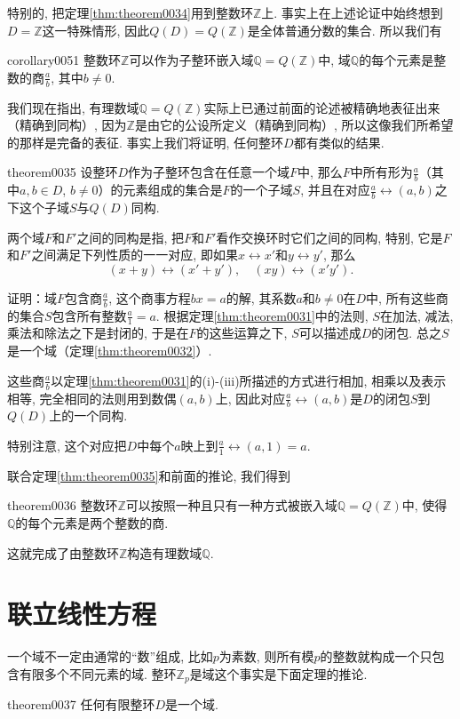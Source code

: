 特别的, 把定理\ref{thm:theorem0034}用到整数环$\mathbb{Z}$上. 事实上在上述论证中始终想到$D=\mathbb{Z}$这一特殊情形, 因此$Q(D)=Q(\mathbb{Z})$是全体普通分数的集合. 所以我们有
\begin{corollary}{}{corollary0051}
整数环$\mathbb{Z}$可以作为子整环嵌入域$\mathbb{Q}=Q(\mathbb{Z})$中, 域$\mathbb{Q}$的每个元素是整数的商$\frac{a}{b}$, 其中$b \neq 0$. 
\end{corollary}

我们现在指出, 有理数域$\mathbb{Q}=Q(\mathbb{Z})$实际上已通过前面的论述被精确地表征出来（精确到同构）, 因为$\mathbb{Z}$是由它的公设所定义（精确到同构）, 所以这像我们所希望的那样是完备的表征. 事实上我们将证明, 任何整环$D$都有类似的结果. 
\begin{theorem}{}{theorem0035}
设整环$D$作为子整环包含在任意一个域$F$中, 那么$F$中所有形为$\frac{a}{b}$（其中$a, b \in D$, $b \neq 0$）的元素组成的集合是$F$的一个子域$S$, 并且在对应$\frac{a}{b} \leftrightarrow (a, b)$之下这个子域$S$与$Q(D)$同构. 
\end{theorem}
两个域$F$和$F'$之间的同构是指, 把$F$和$F'$看作交换环时它们之间的同构, 特别, 它是$F$和$F'$之间满足下列性质的一一对应, 即如果$x \leftrightarrow x'$和$y \leftrightarrow y'$, 那么
\[
(x+y) \leftrightarrow (x'+y'), \quad (xy) \leftrightarrow (x'y').
\]

证明：域$F$包含商$\frac{a}{b}$, 这个商事方程$bx=a$的解, 其系数$a$和$b \neq 0$在$D$中, 所有这些商的集合$S$包含所有整数$\frac{a}{1}=a$. 根据定理\ref{thm:theorem0031}中的法则, $S$在加法, 减法, 乘法和除法之下是封闭的, 于是在$F$的这些运算之下, $S$可以描述成$D$的闭包. 总之$S$是一个域（定理\ref{thm:theorem0032}）. 

这些商$\frac{a}{b}$以定理\ref{thm:theorem0031}的(i)-(iii)所描述的方式进行相加, 相乘以及表示相等, 完全相同的法则用到数偶$(a,b)$上, 因此对应$\frac{a}{b} \leftrightarrow (a, b)$是$D$的闭包$S$到$Q(D)$上的一个同构. 

特别注意, 这个对应把$D$中每个$a$映上到$\frac{a}{1} \leftrightarrow (a,1)=a$. 

联合定理\ref{thm:theorem0035}和前面的推论, 我们得到
\begin{theorem}{}{theorem0036}
整数环$\mathbb{Z}$可以按照一种且只有一种方式被嵌入域$\mathbb{Q}=Q(\mathbb{Z})$中, 使得$\mathbb{Q}$的每个元素是两个整数的商. 
\end{theorem}

这就完成了由整数环$\mathbb{Z}$构造有理数域$\mathbb{Q}$. 

\section{联立线性方程}
一个域不一定由通常的“数”组成, 比如$p$为素数, 则所有模$p$的整数就构成一个只包含有限多个不同元素的域. 整环$\mathbb{Z}_p$是域这个事实是下面定理的推论. 
\begin{theorem}{}{theorem0037}
任何有限整环$D$是一个域. 
\end{theorem}

